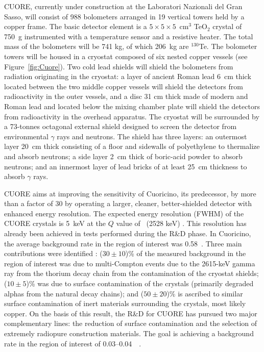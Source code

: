 \documentclass{PoS}
\begin{document}
CUORE, currently under construction at the Laboratori Nazionali del Gran Sasso, will consist of 988 bolometers arranged in 19 vertical towers held by a copper frame. The basic detector element is a $5\times5\times5$~cm$^{3}$ TeO$_{2}$ crystal of 750~g instrumented with a temperature sensor and a resistive heater. The total mass of the bolometers will be 741 kg, of which 206~kg are $^{130}$Te. The bolometer towers will be housed in a cryostat composed of six nested copper vessels (see Figure~\ref{fig:Cuore}). Two cold lead shields will shield the bolometers from radiation originating in the cryostat: a layer of ancient Roman lead 6~cm thick located between the two middle copper vessels will shield the detectors from radioactivity in the outer vessels, and a disc 31 cm thick made of modern and Roman lead and located below the mixing chamber plate will shield the detectors from radioactivity in the overhead apparatus. The cryostat will be surrounded by a 73-tonnes octagonal external shield designed to screen the detector from environmental $\gamma$ rays and neutrons. The shield has three layers: an outermost layer 20~cm thick consisting of a floor and sidewalls of polyethylene to thermalize and absorb neutrons; a side layer 2~cm thick of boric-acid powder to absorb neutrons; and an innermost layer of lead bricks of at least 25~cm thickness to absorb $\gamma$ rays.

CUORE aims at improving the sensitivity of Cuoricino, its predecessor, by more than a factor of 30 by operating a larger, cleaner, better-shielded detector with enhanced energy resolution. The expected energy resolution (FWHM) of the CUORE crystals is 5~keV at the $Q$ value of \TE\ (2528 keV) \cite{Artusa:2014lgv}. This resolution has already been achieved in tests performed during the R\&D phase. In Cuoricino, the average background rate in the region of interest was 0.58~\ckky. Three main contributions were identified \cite{Alessandria:2011rc}: ($30\pm10$)\% of the measured  background in the region of interest was due to multi-Compton events due to the 2615-keV gamma ray from the thorium decay chain from the contamination of the cryostat shields; ($10\pm5$)\% was due to surface contamination of the crystals (primarily degraded alphas from the natural decay chains); and ($50\pm20$)\% is ascribed to similar surface contamination of inert materials surrounding the crystals, most likely copper. On the basis of this result, the R\&D for CUORE has pursued two major complementary lines: the reduction of surface contamination and the selection of extremely radiopure construction materials. The goal is achieving a background rate in the region of interest of 0.03--0.04~\ckky\ \cite{Alessandria:2011rc}.
\end{document}
